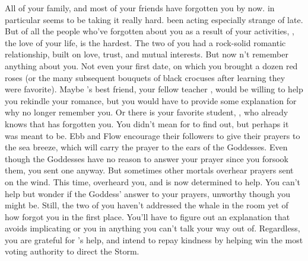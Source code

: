 \documentclass[char]{GL2020}
\begin{document}
All of your family, and most of your friends have forgotten you by now. \cLibrarian{} in particular seems to be taking it really hard. \cLibrarian{\They} \cLibrarian{\have} been acting especially strange of late. But of all the people who've forgotten about you as a result of your activities, \cHeadScientist{\full}, the love of your life, is the hardest. The two of you had a rock-solid romantic relationship, built on love, trust, and mutual interests. But now \cHeadScientist{\they} \cHeadScientist{\does}n't remember anything about you. Not even your first date, on which you brought \cHeadScientist{\them} a dozen red roses (or the many subsequent bouquets of black crocuses after learning they were \cHeadScientist{\their} favorite). Maybe \cHeadScientist{}'s best friend, your fellow teacher \cChupInventor{\full}, would be willing to help you rekindle your romance, but you would have to provide some explanation for why \cHeadScientist{\they} no longer remember\cHeadScientist{\plural} you. Or there is your favorite student, \cInitiate{\full}, who already knows that \cHeadScientist{} has forgotten you. You didn't mean for \cInitiate{} to find out, but perhaps it was meant to be. Ebb and Flow encourage their followers to give their prayers to the sea breeze, which will carry the prayer to the ears of the Goddesses. Even though the Goddesses have no reason to answer your prayer since you forsook them, you sent one anyway. But sometimes other mortals overhear prayers sent on the wind. This time, \cInitiate{} overheard you, and is now determined to help. You can't help but wonder if \cInitiate{\theyare} the Goddess' answer to your prayers, unworthy though you might be. Still, the two of you haven't addressed the whale in the room yet of how \cHeadScientist{} forgot you in the first place. You'll have to figure out an explanation that avoids implicating \cHeadScientist{} or you in anything you can't talk your way out of. Regardless, you are grateful for \cInitiate{}'s help, and intend to repay \cInitiate{\their} kindness by helping \cInitiate{\them} win the most voting authority to direct the Storm. 
\end{document}
